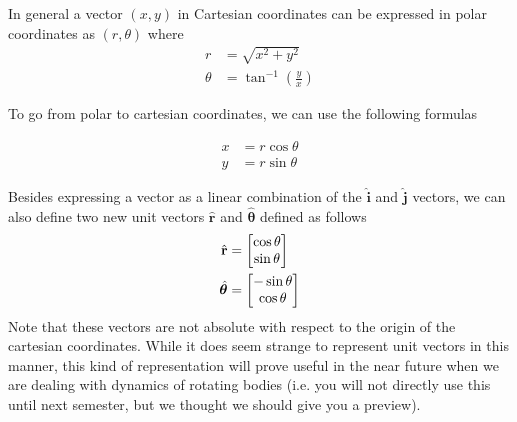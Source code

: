 \documentclass[M3_Night5_Solutions]{subfiles}
\begin{document}
In general a vector $(x,y)$ in Cartesian coordinates can be expressed in polar coordinates as $(r,\theta)$ where
\begin{align}
r &= \sqrt{x^2 + y^2}\\
\theta &= \tan^{-1}\left(\frac{y}{x}\right)
\end{align}

To go from polar to cartesian coordinates, we can use the following formulas

\begin{align*}
x &= r\cos \theta\\
y &= r\sin \theta
\end{align*}

Besides expressing a vector as a linear combination of the $\hat{\mathbf{i}}$ and $\hat{\mathbf{j}}$ vectors, we can also define two new unit vectors $\hat{\mathbf{r}}$ and $\hat{\boldsymbol{\theta}}$ defined as follows
\begin{align}
\hat{\mathbf{r}}   &= \begin{bmatrix} \cos \theta \\ \sin \theta \end{bmatrix}\\
\hat{\boldsymbol{\theta}}  &= \begin{bmatrix} -\sin \theta \\ \cos \theta \end{bmatrix}
\end{align}
Note that these vectors are not absolute with respect to the origin of the cartesian coordinates. While it does seem strange to represent unit vectors in this manner, this kind of representation will prove useful in the near future when we are dealing with dynamics of rotating bodies (i.e. you will not directly use this until next semester, but we thought we should give you a preview).
\vspace{1em}
\end{document}
